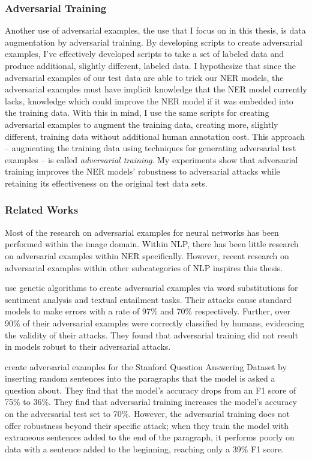 \subsubsection{Adversarial Training}
Another use of adversarial examples, the use that I focus on in this thesis, is data augmentation by adversarial training. By developing scripts to create adversarial examples, I've effectively developed scripts to take a set of labeled data and produce additional, slightly different, labeled data. I hypothesize that since the adversarial examples of our test data are able to trick our NER models, the adversarial examples must have implicit knowledge that the NER model currently lacks, knowledge which could improve the NER model if it was embedded into the training data. With this in mind, I use the same scripts for creating adversarial examples to augment the training data, creating more, slightly different, training data without additional human annotation cost. This approach --  augmenting the training data using techniques for generating adversarial test examples -- is called \textit{adversarial training}.
My experiments show that adversarial training improves the NER models' robustness to adversarial attacks while retaining its effectiveness on the original test data sets. 


\subsubsection{Related Works}
Most of the research on adversarial examples for neural networks has been performed within the image domain. Within NLP, there has been little research on adversarial examples within NER specifically. However, recent research on adversarial examples within other subcategories of NLP inspires this thesis.

\cite{alzantotAdver} use genetic algorithms to create adversarial examples via word substitutions for sentiment analysis and textual entailment tasks. Their attacks cause standard  models to make errors with a rate of 97\% and 70\% respectively. Further, over 90\% of their adversarial examples were correctly classified by humans, evidencing the validity of their attacks. They found that adversarial training did not result in models robust to their adversarial attacks.

\cite{jiaadver} create adversarial examples for the Stanford Question Answering Dataset by inserting random sentences into the paragraphs that the model is asked a question about. They find that the model's accuracy drops from an F1 score of 75\% to 36\%. They find that adversarial training increases the model's accuracy on the adversarial test set to 70\%. However, the adversarial training does not offer robustness beyond  their specific attack; when they train the model with extraneous sentences added to the end of the paragraph, it performs poorly on data with a sentence added to the beginning, reaching only a 39\% F1 score.

